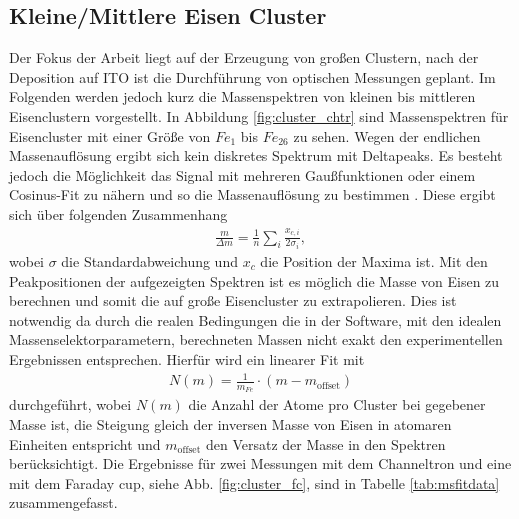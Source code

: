\subsection{Kleine/Mittlere Eisen Cluster}
\label{sec:kleinecluster}
Der Fokus der Arbeit liegt auf der Erzeugung von großen Clustern, nach der Deposition auf ITO ist die Durchführung von optischen Messungen geplant.
Im Folgenden werden jedoch kurz die Massenspektren von kleinen bis mittleren Eisenclustern vorgestellt.
In Abbildung \ref{fig:cluster_chtr} sind Massenspektren für Eisencluster mit einer Größe von $Fe_{1}$ bis $Fe_{26}$ zu sehen.
Wegen der endlichen Massenauflösung ergibt sich kein diskretes Spektrum mit Deltapeaks.
Es besteht jedoch die Möglichkeit das Signal mit mehreren Gaußfunktionen oder einem Cosinus-Fit zu nähern und so die Massenauflösung zu bestimmen \cite[S. 94 ff.]{krause}.
Diese ergibt sich über folgenden Zusammenhang
\begin{align}
  \frac{m}{\Delta m} = \frac{1}{n} \sum\limits_{i} \frac{x_{c,i}}{2 \sigma_i},
\end{align}
wobei $\sigma$ die Standardabweichung und $x_c$ die Position der Maxima ist.
Mit den Peakpositionen der aufgezeigten Spektren ist es möglich die Masse von Eisen zu berechnen und somit die auf große Eisencluster zu extrapolieren.
Dies ist notwendig da durch die realen Bedingungen die in der Software, mit den idealen Massenselektorparametern, berechneten Massen nicht exakt den experimentellen Ergebnissen entsprechen.
Hierfür wird ein linearer Fit mit
\begin{align}
  N\left(m\right) = \frac{1}{m_{Fe}} \cdot \left(m-m_{\text{offset}}\right)
\end{align}
durchgeführt, wobei $N\left(m\right)$ die Anzahl der Atome pro Cluster bei gegebener Masse ist, die Steigung gleich der inversen Masse von Eisen in atomaren Einheiten entspricht und $m_{\text{offset}}$ den Versatz der Masse in den Spektren berücksichtigt.
Die Ergebnisse für zwei Messungen mit dem Channeltron und eine mit dem Faraday cup, siehe Abb. \ref{fig:cluster_fc}, sind in Tabelle \ref{tab:msfitdata} zusammengefasst.


